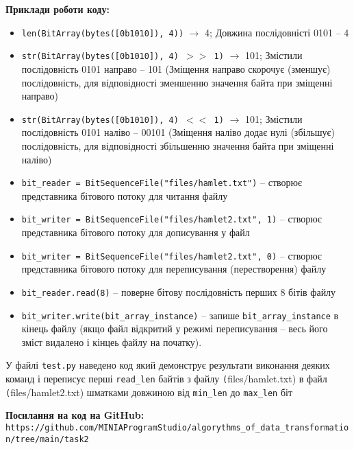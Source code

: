 \documentclass{article}
\def\code#1{\texttt{#1}}
\begin{document}
\textbf{Приклади роботи коду:}
\begin{itemize}
    \item \code{len(BitArray(bytes([0b1010]), 4))} $\rightarrow$  4; Довжина послідовністі 0101 -- 4
    \item \code{str(BitArray(bytes([0b1010]), 4) $>>$ 1)} $\rightarrow$ 101; Змістили послідовність 0101 направо -- 101 (Зміщення направо скорочує (зменшує) послідовність, для відповідності зменшенню значення байта при зміщенні направо)
    \item \code{str(BitArray(bytes([0b1010]), 4) $<<$ 1)} $\rightarrow$ 101; Змістили послідовність 0101 наліво -- 00101 (Зміщення наліво додає нулі (збільшує) послідовність, для відповідності збільшенню значення байта при зміщенні наліво)
    \item \code{bit\_reader = BitSequenceFile("files/hamlet.txt")}  --  створює представника бітового потоку для читання файлу
    \item \code{bit\_writer = BitSequenceFile("files/hamlet2.txt", 1)}  --  створює представника бітового потоку для дописування у файл
    \item \code{bit\_writer = BitSequenceFile("files/hamlet2.txt", 0)}  --  створює представника бітового потоку для переписування (перестворення) файлу
    \item \code{bit\_reader.read(8)} -- поверне бітову послідовність перших 8 бітів файлу
    \item \code{bit\_writer.write(bit\_array\_instance)} -- запише \code{bit\_array\_instance} в кінець файлу (якщо файл відкритий у режимі переписування -- весь його зміст видалено і кінцеь файлу на початку).\\\indent
\end{itemize}
У файлі \code{test.py} наведено код який демонструє результати виконання деяких команд і переписує перші \code{read\_len} байтів з файлу \code(files/hamlet.txt) в файл \code(files/hamlet2.txt) шматками довжиною від \code{min\_len} до \code{max\_len} біт\\\indent

\textbf{Посилання на код на GitHub:}\\
\code{https://github.com/MINIAProgramStudio/algorythms\_of\_data\_transformation/tree/main/task2}
\end{document}
